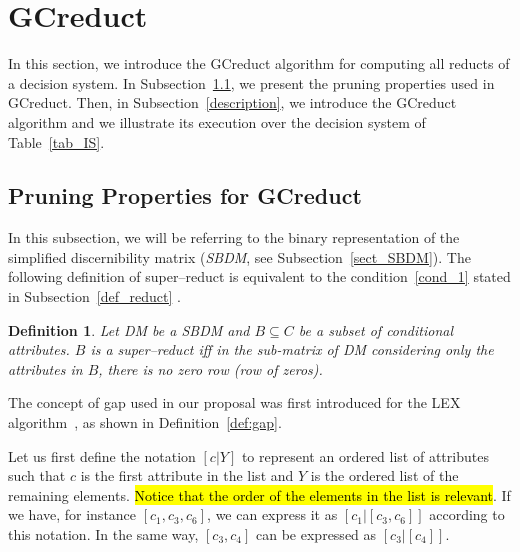 \documentclass[number,preprint,review,12pt]{elsarticle}
\newtheorem{definition}{Definition}
\begin{document}
  
  
\section{GCreduct}\label{GCreduct}
  In this section, we introduce the GCreduct algorithm for computing all reducts of a decision system. In  Subsection~\ref{properties}, we present the pruning properties used in GCreduct. Then, in Subsection~\ref{description}, we introduce the GCreduct algorithm and we illustrate its execution over the decision system of Table~\ref{tab_IS}.
  
\subsection{Pruning Properties for GCreduct}\label{properties}
	In this subsection, we will be referring to the binary representation of the simplified discernibility matrix (\textit{SBDM}, see Subsection~\ref{sect_SBDM}). The following definition of super--reduct is equivalent to the condition~\ref{cond_1} stated in Subsection~\ref{def_reduct} \citep{Lazo15}.
	
	\begin{definition}\label{def:testor}
		Let DM be a SBDM and $B \subseteq C$ be a subset of conditional attributes. $B$ is a super--reduct iff in the sub-matrix of DM considering only the attributes in $B$, there is no zero row (row of zeros).
	\end{definition}
	
	The concept of gap used in our proposal was first introduced for the LEX algorithm~\cite{Santiesteban03}, as shown in Definition~\ref{def:gap}.
	
	Let us first define the notation $[c|Y]$ to represent an ordered list of attributes such that $c$ is the first attribute in the list and $Y$ is the ordered list of the remaining elements. \hl{Notice that the order of the elements in the list is relevant}. If we have, for instance $[c_1,c_3,c_6]$, we can express it as $[c_1|[c_3,c_6]]$ according to this notation. In the same way, $[c_3,c_4]$ can be expressed as $[c_3|[c_4]]$.
	
\end{document}
